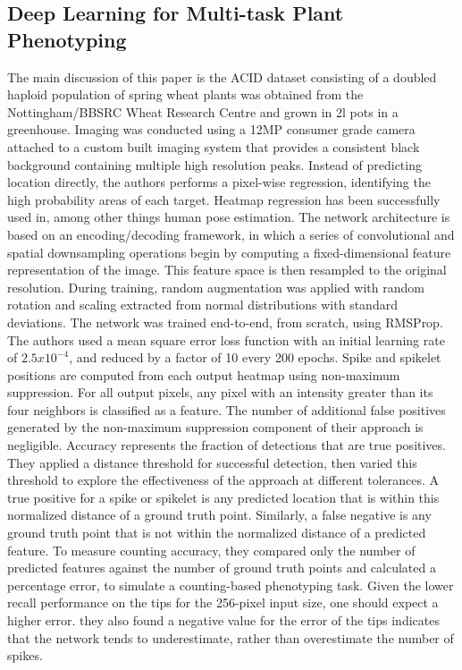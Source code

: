 \subsection{Deep Learning for Multi-task Plant Phenotyping}
The main discussion of this paper\cite{Multi-Task} is the ACID dataset consisting of a doubled haploid population of spring wheat plants was obtained from the Nottingham/BBSRC
Wheat Research Centre and grown in 2l pots in a greenhouse. Imaging was conducted using a 12MP consumer grade camera attached to a custom built imaging system
that provides a consistent black background containing multiple high resolution peaks. Instead of predicting location directly, the authors performs a pixel-wise regression,
identifying the high probability areas of each target. Heatmap regression has been successfully used in, among other things human pose estimation. The network
architecture is based on an encoding/decoding framework, in which a series of convolutional and spatial downsampling operations begin by computing a fixed-dimensional
feature representation of the image. This feature space is then resampled to the original resolution. During training, random augmentation was applied with random
rotation and scaling extracted from normal distributions with standard deviations. The network was trained end-to-end, from scratch, using RMSProp. The authors used
a mean square error loss function with an initial learning rate of $2.5x10^{-4}$, and reduced by a factor of 10 every 200 epochs. Spike and spikelet positions
are computed from each output heatmap using non-maximum suppression. For all output pixels, any pixel with an intensity greater than its four neighbors is classified
as a feature. The number of additional false positives generated by the non-maximum suppression component of their approach is negligible. Accuracy represents the
fraction of detections that are true positives. They applied a distance threshold for successful detection, then varied this threshold to explore the effectiveness
of the approach at different tolerances. A true positive for a spike or spikelet is any predicted location that is within this normalized distance of a ground truth
point. Similarly, a false negative is any ground truth point that is not within the normalized distance of a predicted feature. To measure counting accuracy, they
compared only the number of predicted features against the number of ground truth points and calculated a percentage error, to simulate a counting-based phenotyping
task. Given the lower recall performance on the tips for the 256-pixel input size, one should expect a higher error. they also found a negative value for the error
of the tips indicates that the network tends to underestimate, rather than overestimate the number of spikes.








